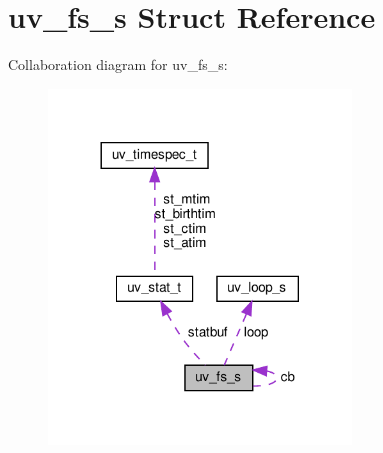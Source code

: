 \hypertarget{structuv__fs__s}{}\section{uv\+\_\+fs\+\_\+s Struct Reference}
\label{structuv__fs__s}


Collaboration diagram for uv\+\_\+fs\+\_\+s\+:
\nopagebreak
\begin{figure}[H]
\begin{center}
\leavevmode
\includegraphics[width=228pt]{structuv__fs__s__coll__graph}
\end{center}
\end{figure}
